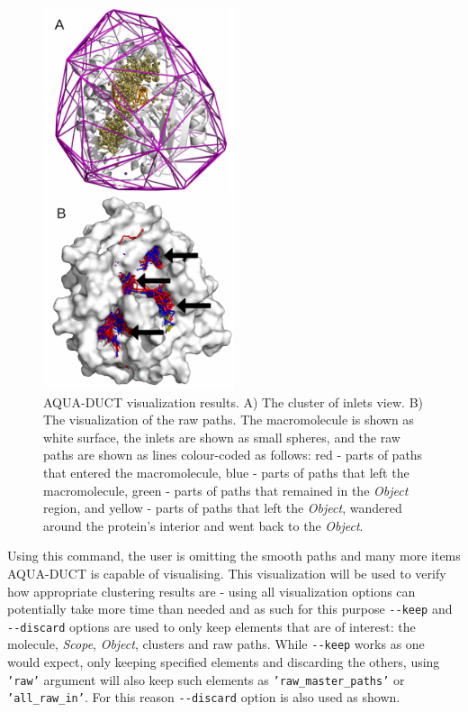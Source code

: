 \documentclass[9pt,tutorial, pubversion]{livecoms}
\begin{document}
\begin{figure}[htp!]
\centering
\includegraphics[width=0.5\textwidth]{Tut1.1.png}
\caption{AQUA-DUCT visualization results. A) The cluster of inlets view. B) The visualization of the raw paths. The macromolecule is shown as white surface, the inlets are shown as small spheres, and the raw paths are shown as lines colour-coded as follows: red - parts of paths that entered the macromolecule, blue - parts of paths that left the macromolecule, green - parts of paths that remained in the \textit{Object} region, and yellow - parts of paths that left the \textit{Object}, wandered around the protein's interior and went back to the \textit{Object}.}
\label{Tut1.1}
\end{figure}

Using this command, the user is omitting the smooth paths and many more items AQUA-DUCT is capable of visualising. This visualization will be used to verify how appropriate clustering results are - using all visualization options can potentially take more time than needed and as such for this purpose \texttt{-{}-keep} and \texttt{-{}-discard} options are used to only keep elements that are of interest: the molecule, \textit{Scope}, \textit{Object}, clusters and raw paths. While \texttt{-{}-keep} works as one would expect, only keeping specified elements and discarding the others, using \texttt{'raw'} argument will also keep such elements as \texttt{'raw\_master\_paths'} or \texttt{'all\_raw\_in'}. For this reason \texttt{-{}-discard} option is also used as shown. 
\end{document}
